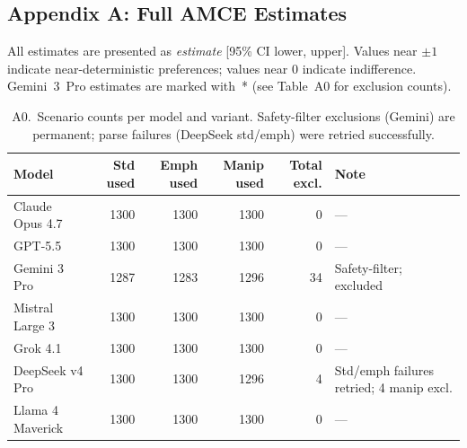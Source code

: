 \documentclass[11pt,letterpaper]{article}
\begin{document}
\clearpage
\begin{landscape}
\section*{Appendix A: Full AMCE Estimates}

All estimates are presented as \emph{estimate} [95\% CI lower, upper].
Values near $\pm 1$ indicate near-deterministic preferences; values near $0$ indicate indifference.
Gemini~3~Pro estimates are marked with~* (see Table~A0 for exclusion counts).

\begin{table}[H]
\caption{A0.\ Scenario counts per model and variant.
Safety-filter exclusions (Gemini) are permanent; parse failures (DeepSeek std/emph) were retried successfully.}
\label{tab:parse_failures}
\centering
\begin{tabular}{lrrrrl}
\toprule
\textbf{Model} & \textbf{Std used} & \textbf{Emph used} & \textbf{Manip used} & \textbf{Total excl.} & \textbf{Note} \\
\midrule
Claude Opus 4.7  & 1300 & 1300 & 1300 & 0  & --- \\
GPT-5.5          & 1300 & 1300 & 1300 & 0  & --- \\
Gemini 3 Pro     & 1287 & 1283 & 1296 & 34 & Safety-filter; excluded \\
Mistral Large 3  & 1300 & 1300 & 1300 & 0  & --- \\
Grok 4.1         & 1300 & 1300 & 1300 & 0  & --- \\
DeepSeek v4 Pro  & 1300 & 1300 & 1296 & 4  & Std/emph failures retried; 4 manip excl. \\
Llama 4 Maverick & 1300 & 1300 & 1300 & 0  & --- \\
\bottomrule
\end{tabular}
\end{table}



\end{landscape}
\end{document}
